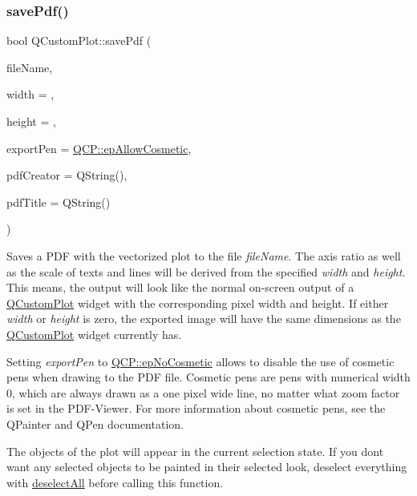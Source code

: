 \subsubsection{\texorpdfstring{save\+Pdf()}{savePdf()}}
{\footnotesize\ttfamily bool Q\+Custom\+Plot\+::save\+Pdf (\begin{DoxyParamCaption}\item[{const Q\+String \&}]{file\+Name,  }\item[{int}]{width = {},  }\item[{int}]{height = {},  }\item[{\mbox{\hyperlink{namespace_q_c_p_a17844f19e1019693a953e1eb93536d2f}{Q\+C\+P\+::\+Export\+Pen}}}]{export\+Pen = {\ttfamily \mbox{\hyperlink{namespace_q_c_p_a17844f19e1019693a953e1eb93536d2fa50d3657dba3fb90560b93a823cb0a6e8}{Q\+C\+P\+::ep\+Allow\+Cosmetic}}},  }\item[{const Q\+String \&}]{pdf\+Creator = {\ttfamily QString()},  }\item[{const Q\+String \&}]{pdf\+Title = {\ttfamily QString()} }\end{DoxyParamCaption})}

Saves a P\+DF with the vectorized plot to the file {\itshape file\+Name}. The axis ratio as well as the scale of texts and lines will be derived from the specified {\itshape width} and {\itshape height}. This means, the output will look like the normal on-\/screen output of a \mbox{\hyperlink{class_q_custom_plot}{Q\+Custom\+Plot}} widget with the corresponding pixel width and height. If either {\itshape width} or {\itshape height} is zero, the exported image will have the same dimensions as the \mbox{\hyperlink{class_q_custom_plot}{Q\+Custom\+Plot}} widget currently has.

Setting {\itshape export\+Pen} to \mbox{\hyperlink{namespace_q_c_p_a17844f19e1019693a953e1eb93536d2faae8fcfaafee234ce18558afef83f6a78}{Q\+C\+P\+::ep\+No\+Cosmetic}} allows to disable the use of cosmetic pens when drawing to the P\+DF file. Cosmetic pens are pens with numerical width 0, which are always drawn as a one pixel wide line, no matter what zoom factor is set in the P\+D\+F-\/\+Viewer. For more information about cosmetic pens, see the Q\+Painter and Q\+Pen documentation.

The objects of the plot will appear in the current selection state. If you don\textquotesingle{}t want any selected objects to be painted in their selected look, deselect everything with \mbox{\hyperlink{class_q_custom_plot_a9d4808ab925b003054085246c92a257c}{deselect\+All}} before calling this function.

